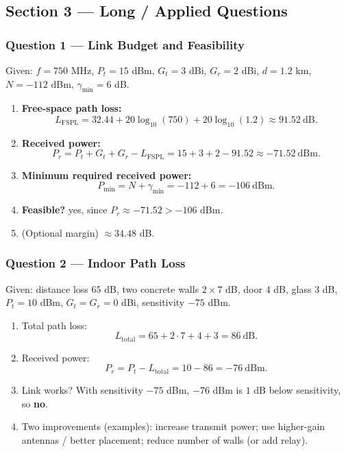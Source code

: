 \documentclass[11pt,a4paper]{article}
\begin{document}
\subsection*{Section 3 --- Long / Applied Questions}

\subsubsection*{Question 1 --- Link Budget and Feasibility}
Given: $f=750$ MHz, $P_t=15$ dBm, $G_t=3$ dBi, $G_r=2$ dBi, $d=1.2$ km, $N=-112$ dBm, $\gamma_{\min}=6$ dB.

\begin{enumerate}[label=\alph*.]
    \item \textbf{Free-space path loss:}
    \[
    L_{\mathrm{FSPL}}=32.44+20\log_{10}(750)+20\log_{10}(1.2)\approx 91.52\ \mathrm{dB}.
    \]
    \item \textbf{Received power:}
    \[
    P_r=P_t+G_t+G_r-L_{\mathrm{FSPL}}=15+3+2-91.52\approx -71.52\ \mathrm{dBm}.
    \]
    \item \textbf{Minimum required received power:}
    \[
    P_{\min}=N+\gamma_{\min}=-112+6=-106\ \mathrm{dBm}.
    \]
    \item \textbf{Feasible?} yes, since $P_r\approx -71.52 > -106$ dBm.
    \item (Optional margin) $\approx 34.48$ dB.
    
\end{enumerate}

\subsubsection*{Question 2 --- Indoor Path Loss}
Given: distance loss $65$ dB, two concrete walls $2\times 7$ dB, door $4$ dB, glass $3$ dB, $P_t=10$ dBm, $G_t=G_r=0$ dBi, sensitivity $-75$ dBm.

\begin{enumerate}[label=\alph*.]
    \item Total path loss:
    \[
    L_{\text{total}}=65+2\cdot 7+4+3=86\ \mathrm{dB}.
    \]
    \item Received power:
    \[
    P_r=P_t-L_{\text{total}}=10-86=-76\ \mathrm{dBm}.
    \]
    \item Link works? With sensitivity $-75$ dBm, $-76$ dBm is $1$ dB below sensitivity, so \textbf{no}.
    \item Two improvements (examples): increase transmit power; use higher-gain antennas / better placement; reduce number of walls (or add relay).
\end{enumerate}
\end{document}
